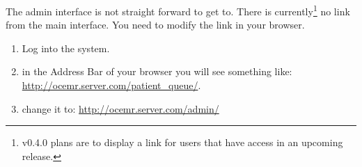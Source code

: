 The admin interface is not straight forward to get to. There is
currently\footnote{ v0.4.0 plans are to display a link for users
that have access in an upcoming release. } no link from the main
interface. You need to modify the link in your browser.

\begin{enumerate}
\item Log into the system.
\item in the Address Bar of your browser you will see something like: \url{http://ocemr.server.com/patient_queue/}.
\item change it to: \url{http://ocemr.server.com/admin/}
\end{enumerate}
